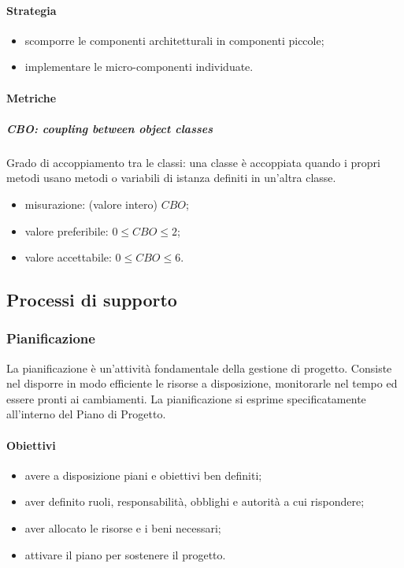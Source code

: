 		\paragraph{Strategia}
		\begin{itemize}
			\item scomporre le componenti architetturali in componenti piccole;
			\item implementare le micro-componenti individuate.
		\end{itemize}
		\paragraph{Metriche}
			\subparagraph{CBO: coupling between object classes} 
			Grado di accoppiamento tra le classi: una classe è accoppiata quando i propri metodi usano metodi o variabili di istanza definiti in un'altra classe. 
			\begin{itemize}
				\item misurazione: (valore intero) $CBO$;
				\item valore preferibile: $0 \leq CBO \leq 2$;
				\item valore accettabile: $0 \leq CBO \leq 6$.
			\end{itemize}
		
\subsection{Processi di supporto}
	\subsubsection{Pianificazione}
	La pianificazione è un'attività fondamentale della gestione di progetto. Consiste nel disporre in modo efficiente le risorse a disposizione, monitorarle nel tempo ed essere pronti ai cambiamenti. La pianificazione si esprime specificatamente all'interno del Piano di Progetto.
		\paragraph{Obiettivi}
		\begin{itemize}
			\item avere a disposizione piani e obiettivi ben definiti;
			\item aver definito ruoli, responsabilità, obblighi e autorità a cui rispondere;
			\item aver allocato le risorse e i beni necessari;
			\item attivare il piano per sostenere il progetto.
		\end{itemize}	
